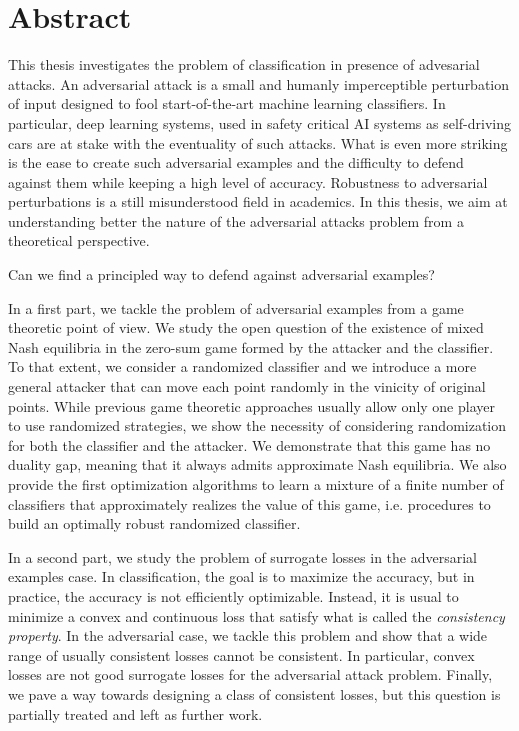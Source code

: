\chapter*{Abstract}
This thesis investigates the problem of classification in presence of advesarial attacks. An adversarial attack is a small and humanly imperceptible perturbation of input designed to fool start-of-the-art machine learning classifiers. In particular, deep learning systems, used in safety critical AI systems as self-driving cars are at stake with the eventuality of such attacks. What is even more striking is the ease to create such adversarial examples and the difficulty to defend against them while keeping a high level of accuracy. Robustness to adversarial perturbations is a still misunderstood field in academics. In this thesis, we aim at understanding better the nature of the adversarial attacks problem from a theoretical perspective.


\begin{tcolorbox}[colback=grund,colframe=rahmen]
\begin{center}
    Can we find a principled way to defend against adversarial examples?
\end{center}
\end{tcolorbox}


In a first part, we tackle the problem of adversarial examples from a game theoretic point of view. We study the open question of the existence of mixed Nash equilibria in the zero-sum game formed by the attacker and the classifier. To that extent, we consider a randomized classifier and we introduce a more general attacker that can move each point randomly in the vinicity of original points. While previous game theoretic approaches usually allow only one player to use randomized strategies, we show the necessity of considering randomization for both the classifier and the attacker. We demonstrate that this game has no duality gap, meaning that it always admits approximate Nash equilibria. We also provide the first optimization algorithms to learn a mixture of a finite number of classifiers that approximately realizes the value of this game, i.e. procedures to build an optimally robust randomized classifier.



In a second part, we study the problem of surrogate losses in the adversarial examples case. In classification, the goal is to maximize the accuracy, but in practice, the accuracy is not efficiently optimizable. Instead, it is usual to minimize a convex and continuous loss that satisfy what is called the \emph{consistency property}. In the adversarial case, we tackle this problem and show that a wide range of usually consistent losses cannot be consistent. In particular, convex losses are not good  surrogate losses for the adversarial attack problem.  Finally, we pave a way towards designing a class of consistent losses, but this question is partially treated and left as further work.


